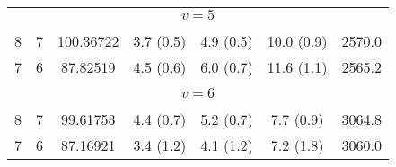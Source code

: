 \begin{table*}[htp]
\begin{tabular}{ccccccc}
\multicolumn{7}{c}{$v = 5$} \\
\vspace{-0.75em}\\
 8 & 7 & 100.36722 & 3.7 (0.5) & 4.9 (0.5) & 10.0 (0.9) & 2570.0 \\
 7 & 6 & 87.82519 & 4.5 (0.6) & 6.0 (0.7) & 11.6 (1.1) & 2565.2 \\
&\vspace{-0.75em}\\
\multicolumn{7}{c}{$v = 6$} \\
\vspace{-0.75em}\\
 8 & 7 & 99.61753 & 4.4 (0.7) & 5.2 (0.7) & 7.7 (0.9) & 3064.8 \\
 7 & 6 & 87.16921 & 3.4 (1.2) & 4.1 (1.2) & 7.2 (1.8) & 3060.0 \\
\hline
\end{tabular}

\par 
\end{table*}
